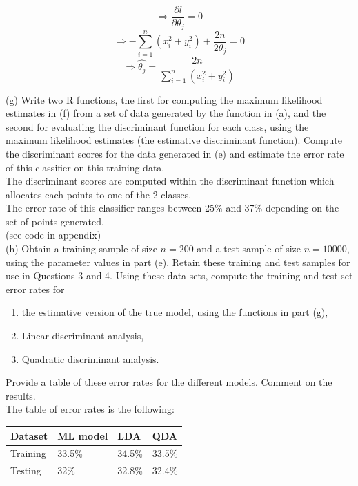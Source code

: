 \documentclass{article}
\begin{document}
$$\Rightarrow \frac{\partial l}{\partial \theta_{j}}=0$$
$$\Rightarrow -\sum_{i=1}^{n}(x_{i}^2+y_{i}^2) + \frac{2n}{2\theta_{j}}=0$$
$$\Rightarrow  \widehat{\theta_{j}}=\frac{2n}{\sum_{i=1}^{n}(x_{i}^2+y_{i}^2)}$$
$$ $$


(g) Write two R functions, the first for computing the maximum likelihood estimates in (f) from a set of data generated by the function in (a), and the second for evaluating the discriminant function for each class, using the maximum likelihood estimates (the estimative discriminant function). Compute the discriminant scores for the data generated in (e) and estimate the error rate of this classifier on this training data. \\

The discriminant scores are computed within the discriminant function which allocates each points to one of the 2 classes.\\
The error rate of this classifier ranges between  25\%  and 37\% depending on the set of points generated.\\
(see code in appendix)\\


(h) Obtain a training sample of size $n = 200$ and a test sample of size $n = 10000$, using the parameter values in part (e). Retain these training and test samples for use in Questions 3 and 4. Using these data sets, compute the training and test set error rates for
\begin{enumerate}[label=\roman*.]
\item the estimative version of the true model, using the functions in part (g),
\item Linear discriminant analysis,
\item Quadratic discriminant analysis.
\end{enumerate}
Provide a table of these error rates for the different models. Comment on the results.\\


The table of error rates is the following:

\begin{center}
    \begin{tabular}{ | l | l | l | p{1.5cm} |}
    \hline
    Dataset & ML model& LDA & QDA \\ \hline
    Training & 33.5\% & 34.5\% & 33.5\% \\ \hline
    Testing & 32\% & 32.8\% & 32.4\% \\ \hline
   
    \end{tabular}
\end{center}
\end{document}
